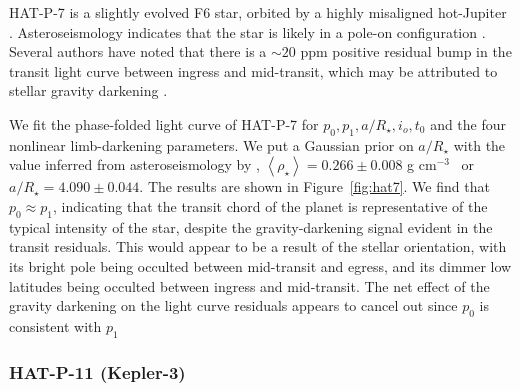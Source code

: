 HAT-P-7 is a slightly evolved F6 star, orbited by a highly misaligned hot-Jupiter \citep{pal2008,Winn2009}. Asteroseismology indicates that the star is likely in a pole-on configuration \citep{Lund2014,Benomar2014}. Several authors have noted that there is a $\sim 20$ ppm positive residual bump in the transit light curve between ingress and mid-transit, which may be attributed to stellar gravity darkening \citep{VanEylen2012,Morris2013,Masuda2015}.

We fit the phase-folded \kepler light curve of HAT-P-7 for $p_0, p_1, a/R_\star, i_o, t_0$ and the four nonlinear limb-darkening parameters. We put a Gaussian prior on $a/R_\star$ with the value inferred from asteroseismology by \citep{Lund2014}, $\left< \rho_\star \right> =  0.266 \pm 0.008$ g cm$^{-3}$ \, or $ a/R_\star= 4.090 \pm 0.044$. The results are shown in Figure~\ref{fig:hat7}. We find that $p_0 \approx p_1$, indicating that the transit chord of the planet is representative of the typical intensity of the star, despite the gravity-darkening signal evident in the transit residuals. This would appear to be a result of the stellar orientation, with its bright pole being occulted between mid-transit and egress, and its dimmer low latitudes being occulted between ingress and mid-transit. The net effect of the gravity darkening on the light curve residuals appears to cancel out since $p_0$ is consistent with $p_1$
 
\subsubsection{HAT-P-11 (Kepler-3)} \label{sec:hat11}

